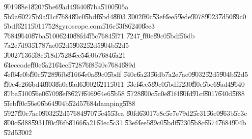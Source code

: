 \clearpage%

\begin{case}
\U{9019}\U{88e1}\U{8207}\U{5be6}\U{9ad4}\U{9640}\U{87ba}\U{5100}\U{505a}%
\U{5b9a}\U{6027}\U{5b9a}\U{91cf}\U{7684}\U{89c0}\U{5bdf}\U{6bd4}\U{8f03}%
\U{3002}\U{ff0c}\U{53ef}\U{4ee5}\U{9ede}\U{9078}\U{9023}\U{7d50}\U{89c0}%
\U{5bdf}\U{6211}\U{5011}\U{7528}gyroscope.com\U{516c}\U{53f8}\U{6240}\U{8ce3}%
\U{7684}\U{9640}\U{87ba}\U{5100}\U{6240}\U{88fd}\U{4f5c}\U{7684}\U{5f71}%
\U{7247}\href{http://tinypic.com/r/2clcee/8}{\underline{\color{blue}%
}}\U{ff0c}\U{89c0}\U{5bdf}\U{56db}%
\U{7a2e}\U{7d93}\U{5178}\U{7ae0}\U{52d5}\U{9032}\U{52d5}\U{904b}\U{52d5}%
\U{3002}\U{7136}\U{5f8c}\U{518d}\U{7528}\U{4ee5}\U{4e0b}\U{7684}\U{6a21}%
\U{64ec}code\U{ff0c}\U{6a21}\U{64ec}\U{5728}\U{76f8}\U{540c}\U{7684}\U{689d}%
\U{4ef6}\U{4e0b}\U{ff0c}\U{5728}\U{96fb}\U{8166}\U{4e0a}\U{89c0}\U{5bdf}%
\U{540c}\U{6a23}\U{56db}\U{7a2e}\U{7ae0}\U{9032}\U{52d5}\U{904b}\U{52d5}%
\U{ff0c}\U{4e26}\U{6bd4}\U{8f03}\U{8a0e}\U{8ad6}\U{3002}\U{6211}\U{5011}%
\U{53ef}\U{4ee5}\U{89c0}\U{5bdf}\U{5230}\U{ff0c}\U{5be6}\U{9ad4}\U{9640}%
\U{87ba}\U{5100}\U{56e0}\U{6709}\U{8ef8}\U{627f}\U{6469}\U{64e6}\U{5b58}%
\U{5728}\U{800c}\U{5c0e}\U{81f4}\U{80fd}\U{91cf}\U{8017}\U{640d}\U{5f88}%
\U{5feb}\U{ff0c}\U{56e0}\U{6b64}\U{904b}\U{52d5}\U{7684}damping\U{5f88}%
\U{5927}\U{ff0c}\U{7ae0}\U{9032}\U{52d5}\U{7684}\U{9707}\U{5e45}\U{53ea}%
\U{80fd}\U{6301}\U{7e8c}\U{5e7e}\U{79d2}\U{5c31}\U{56e0}\U{963b}\U{5c3c}%
\U{800c}\U{6d88}\U{5931}\U{ff0c}\U{96fb}\U{8166}\U{6a21}\U{64ec}\U{5c31}%
\U{53ef}\U{4ee5}\U{89c0}\U{5bdf}\U{5230}\U{5b8c}\U{6574}\U{7684}\U{904b}%
\U{52d5}\U{3002}
\end{case}

%

